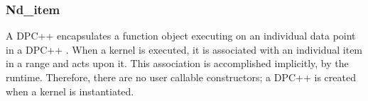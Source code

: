 \documentclass[letterpaper,10pt,english]{sphinxmanual}
\begin{document}
\begin{fulllineitems}
\begin{fulllineitems}
\begin{quote}
\begin{description}
\end{description}\end{quote}

\end{fulllineitems}


\begin{fulllineitems}
\label{\detokenize{programming-interface/parallelism/item:_CPPv4NK4itemcv4itemI10dimensionsXL1EEEEv}}%
\pysigstartmultiline
{}%
\pysigstopmultiline
\end{fulllineitems}


\begin{fulllineitems}
\label{\detokenize{programming-interface/parallelism/item:_CPPv4NK4item13get_linear_idEv}}%
\pysigstartmultiline
{}%
\pysigstopmultiline
\end{fulllineitems}


\end{fulllineitems}



\subsubsection{Nd\_item}
\label{\detokenize{programming-interface/parallelism/nd-item:nd-item}}\label{\detokenize{programming-interface/parallelism/nd-item:id1}}\label{\detokenize{programming-interface/parallelism/nd-item::doc}}
A DPC++  encapsulates a function object executing on an
individual data point in a DPC++ . When a kernel is
executed, it is associated with an individual item in a range and acts
upon it. This association is accomplished implicitly, by the runtime.
Therefore, there are no user callable constructors; a DPC++ 
is created when a kernel is instantiated.
\end{document}
